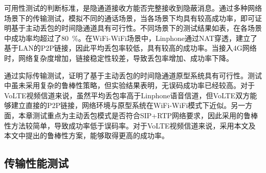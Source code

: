
可用性测试的判断标准，是隐通道接收方能否完整接收到隐蔽消息。通过多种网络场景下的传输测试，模拟不同的通话场景，当各场景下均具有较高成功率，即可证明基于主动丢包的时间隐通道具有可行性。不同场景下的测试结果如表，在各场景中成功率均超过了{80\ \%}。在WiFi-WiFi场景中，Linphone通过NAT穿透，建立了基于LAN的P2P链接，因此平均丢包率较低，具有较高的成功率。当接入4G网络时，网络复杂度增加，链接稳定性较差，导致丢包率增加、成功率下降。

通过实际传输测试，证明了基于主动丢包的时间隐通道原型系统具有可行性。测试中虽未采用复杂的鲁棒性策略，但实验结果表明，无误码成功率已经较高。对于VoLTE视频信道来说，虽然平均丢包率高于Linphone语音信道，但VoLTE双方能够建立直接的P2P链接，网络环境与原型系统在WiFi-WiFi模式下近似。另一方面，本章测试重点为主动丢包模式是否符合SIP+RTP网络要求，因此采用的鲁棒性方法较简单，导致成功率低于误码率。对于VoLTE视频信道来说，采用本文及本文中提出的鲁棒性方案，能够取得更高的成功率。

\subsection{传输性能测试}
\label{chap:linphone:result:throughput}

